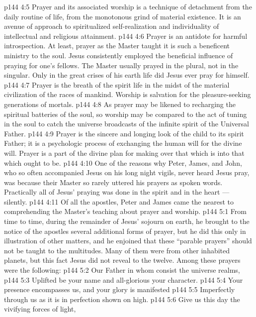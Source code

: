 \vs p144 4:5 Prayer and its associated worship is a technique of detachment from the daily routine of life, from the monotonous grind of material existence. It is an avenue of approach to spiritualized self\hyp{}realization and individuality of intellectual and religious attainment.
\vs p144 4:6 Prayer is an antidote for harmful introspection. At least, prayer as the Master taught it is such a beneficent ministry to the soul. Jesus consistently employed the beneficial influence of praying for one’s fellows. The Master usually prayed in the plural, not in the singular. Only in the great crises of his earth life did Jesus ever pray for himself.
\vs p144 4:7 Prayer is the breath of the spirit life in the midst of the material civilization of the races of mankind. Worship is salvation for the pleasure\hyp{}seeking generations of mortals.
\vs p144 4:8 As prayer may be likened to recharging the spiritual batteries of the soul, so worship may be compared to the act of tuning in the soul to catch the universe broadcasts of the infinite spirit of the Universal Father.
\vs p144 4:9 Prayer is the sincere and longing look of the child to its spirit Father; it is a psychologic process of exchanging the human will for the divine will. Prayer is a part of the divine plan for making over that which is into that which ought to be.
\vs p144 4:10 \pc One of the reasons why Peter, James, and John, who so often accompanied Jesus on his long night vigils, never heard Jesus pray, was because their Master so rarely uttered his prayers as spoken words. Practically all of Jesus’ praying was done in the spirit and in the heart --- silently.
\vs p144 4:11 Of all the apostles, Peter and James came the nearest to comprehending the Master’s teaching about prayer and worship.
\vs p144 5:1 From time to time, during the remainder of Jesus’ sojourn on earth, he brought to the notice of the apostles several additional forms of prayer, but he did this only in illustration of other matters, and he enjoined that these “parable prayers” should not be taught to the multitudes. Many of them were from other inhabited planets, but this fact Jesus did not reveal to the twelve. Among these prayers were the following:
\vsetoff
\vs p144 5:2 Our Father in whom consist the universe realms,
\vs p144 5:3 \hsetoff Uplifted be your name and all\hyp{}glorious your character.
\vs p144 5:4 Your presence encompasses us, and your glory is manifested
\vs p144 5:5 \hsetoff Imperfectly through us as it is in perfection shown on high.
\vs p144 5:6 Give us this day the vivifying forces of light,
